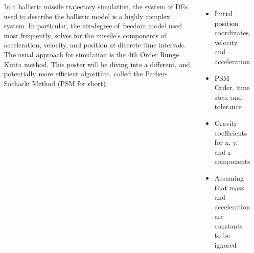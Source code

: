 \documentclass[25pt, a0paper, portrait]{tikzposter}
\begin{document}
\begin{columns}
    {
        In a ballistic missile trajectory simulation, the system of DEs used to describe the 
        ballistic model is a highly complex system. In particular, the six-degree of freedom model
        used most frequently, solves for the missile's components of acceleration, velocity, and 
        position at discrete time intervals. The usual approach for simulation is the 4th Order 
        Runge Kutta method. This poster will be diving into a different, and potentially more 
        efficient algorithm, called the Parker-Sochacki Method (PSM for short).
    }
    {           
        \begin{itemize}
            \item Initial position coordinates, velocity, and acceleration 
            \item PSM Order, time step, and tolerance 
            \item Gravity coefficients for x, y, and z components
            \item Assuming that mass and acceleration are constants to be ignored
        \end{itemize}
        \vspace{.3cm}
    }
\end{columns}
\end{document}
